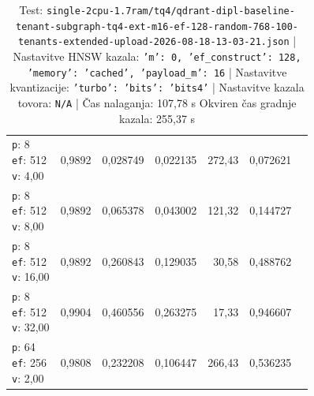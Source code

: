 \begin{table}[htbp]
\begin{tabularx}{\textwidth}{Xrrrrrr}
    \makecell{\texttt{p}: 8\\\texttt{ef}: 512\\\texttt{v}: 4,00} & 0,9892 & 0,028749 & 0,022135 & 272,43 & 0,072621 \\
    \makecell{\texttt{p}: 8\\\texttt{ef}: 512\\\texttt{v}: 8,00} & 0,9892 & 0,065378 & 0,043002 & 121,32 & 0,144727 \\
    \makecell{\texttt{p}: 8\\\texttt{ef}: 512\\\texttt{v}: 16,00} & 0,9892 & 0,260843 & 0,129035 & 30,58 & 0,488762 \\
    \makecell{\texttt{p}: 8\\\texttt{ef}: 512\\\texttt{v}: 32,00} & 0,9904 & 0,460556 & 0,263275 & 17,33 & 0,946607 \\
    \makecell{\texttt{p}: 64\\\texttt{ef}: 256\\\texttt{v}: 2,00} & 0,9808 & 0,232208 & 0,106447 & 266,43 & 0,536235 \\
    \bottomrule
  \end{tabularx}
\caption* {Test: \texttt{single-2cpu-1.7ram/tq4/qdrant-dipl-baseline-tenant-subgraph-tq4-ext-m16-ef-128-random-768-100-tenants-extended-upload-2026-08-18-13-03-21.json} | Nastavitve HNSW kazala: \texttt{{'m': 0, 'ef\_construct': 128, 'memory': 'cached', 'payload\_m': 16}} | Nastavitve kvantizacije: \texttt{{'turbo': {'bits': 'bits4'}}} | Nastavitve kazala tovora: \texttt{N/A} | Čas nalaganja: 107,78 s Okviren čas gradnje kazala: 255,37 s}\end{table}


